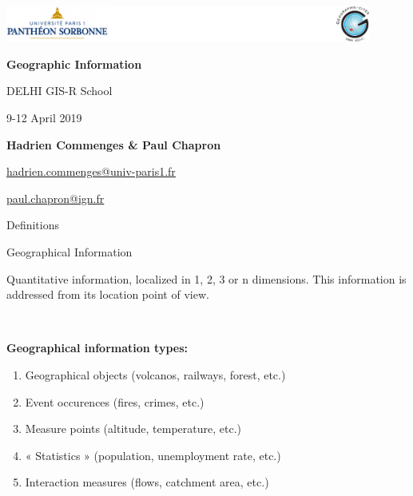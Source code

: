 \graphicspath{{IMAGE/}}

\begin{frame}
\includegraphics[width=12cm]{Logos.pdf}

\vfill

\begin{center}

\vspace*{1.5cm}

\LARGE
\textbf{Geographic Information}

\vspace*{1.5cm}
 DELHI GIS-R School


\large
9-12 April 2019

\vspace*{1.5cm}


\textbf{Hadrien Commenges \& Paul Chapron}

{\small

\vspace*{0.1cm}

\url{hadrien.commenges@univ-paris1.fr}

\url{paul.chapron@ign.fr}

}

\end{center}

\end{frame}


\begin{frame}{Definitions}

\begin{block}{Geographical Information }

Quantitative information, localized in 1, 2, 3 or n dimensions. 
This information is addressed from its location point of view.
\end{block}

~

\textbf{Geographical information types:}

\begin{enumerate}
\item Geographical objects (volcanos, railways, forest, etc.)
\item Event occurences (fires, crimes, etc.)
\item Measure points (altitude, temperature, etc.)
\item « Statistics » (population, unemployment rate, etc.)
\item Interaction measures (flows, catchment area, etc.)
\end{enumerate}

\end{frame}



